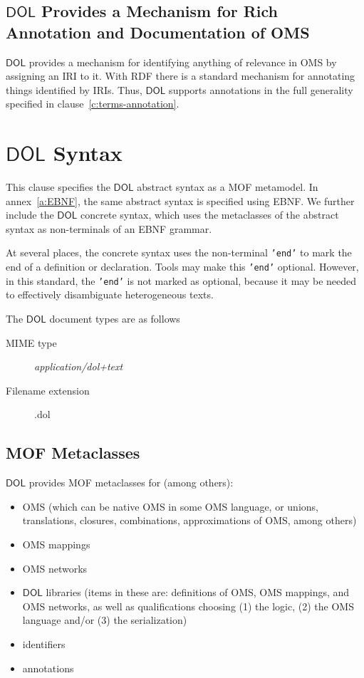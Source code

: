 \documentclass[10pt,fleqn,final]{scrreprt}
\newcommand{\red}[1]{#1} %
\newcommand*{\mimetype}[1]{\textit{#1}}
\newcommand*{\syntax}[1]{\texttt{#1}}
\newcommand*{\DOL}{\ensuremath{\mathsf{DOL}}\xspace}
\newcommand{\clauserefname}{clause}
\newcommand{\cref}[1]{\clauserefname~\ref{#1}}
\newcommand{\clause}[1]{\chapter{#1}}
\newcommand{\sclause}[1]{\section{#1}}
\newenvironment{definitions}[0]{\medskip }{}
\begin{document}
\begin{definitions}
\section{\DOL Provides a Mechanism for Rich Annotation and Documentation of OMS}\label{c:req:annotation}

\DOL provides a mechanism for identifying anything of relevance in OMS by assigning an IRI to it.  With RDF there is a standard mechanism for annotating things identified by IRIs.  Thus, \DOL supports  annotations in the full generality specified in \cref{c:terms-annotation}.




\clause{\DOL  Syntax}\label{c:abstract-syntax}%


This clause specifies the \DOL abstract syntax as a MOF metamodel.
In annex~\ref{a:EBNF}, the same abstract syntax is specified using EBNF.
We further include  the \DOL concrete syntax, which
uses the metaclasses of the abstract syntax as non-terminals of
an EBNF grammar.


At several places, the concrete syntax uses the non-terminal
\syntax{'end'} to mark the end of a definition or declaration. Tools
may make this \syntax{'end'} optional. However, in this standard,
the \syntax{'end'} is not marked as optional, because it may be needed to effectively
disambiguate heterogeneous texts.


\medskip
The \DOL document types are as follows
		\begin{description}
			\item[MIME type] \mimetype{application/dol+text}
			\item[Filename extension] .dol
		\end{description}


\sclause{MOF Metaclasses}

\DOL provides MOF metaclasses for (among others):   
\begin{itemize}
\item OMS (which can be native OMS in some OMS language, or unions, translations,  closures, combinations, approximations of OMS, among others)
\item OMS mappings 
\item OMS networks
\item \DOL libraries (items in these are: definitions of OMS, OMS mappings, and OMS networks, as well as qualifications choosing (1) the logic,
(2) the OMS language and/or (3) the serialization)
\item identifiers
\item annotations
\end{itemize}
 

\end{definitions}
\end{document}
